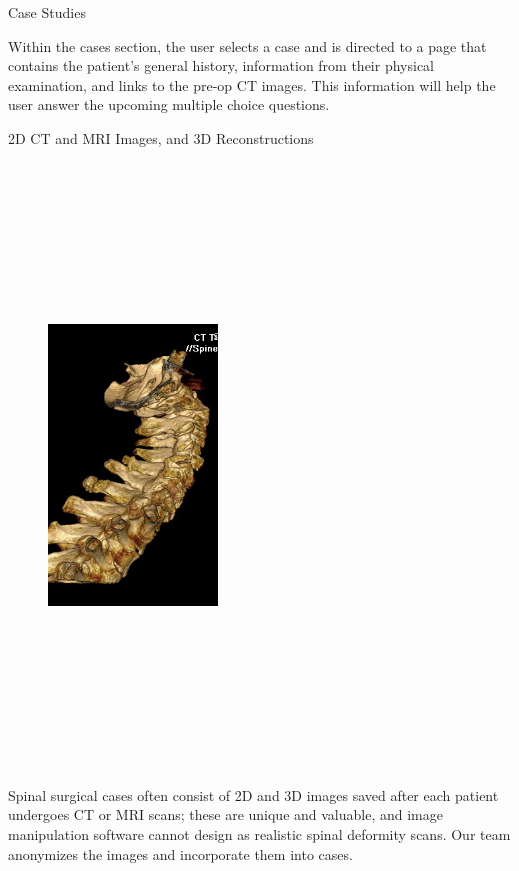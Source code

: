 \documentclass[final]{beamer}
\newlength{\onecolwid}
\begin{document}
\begin{frame}[t]
\begin{columns}[t]
\begin{column}{\onecolwid}
\begin{block}{\LARGE Case Studies}
\begin{figure}
\end{figure}
\large
Within the cases section, the user selects a case and is directed to a page that contains the patient's general history, information from their physical examination, and links to the pre-op CT images. This information will help the user answer the upcoming multiple choice questions. 
\end{block}


\begin{block}{\LARGE 2D CT and MRI Images, and 3D Reconstructions}

\begin{figure}
\centering
\includegraphics[width=0.4\textwidth, height=16cm]{ct-spine.png}
\end{figure}
\large
Spinal surgical cases often consist of 2D and 3D images saved after each patient undergoes CT or MRI scans; these are unique and valuable, and image manipulation software cannot design as realistic spinal deformity scans. Our team anonymizes the images and incorporate them into cases.
\newline
\end{block}


\end{column}
\end{columns}
\end{frame}
\end{document}
